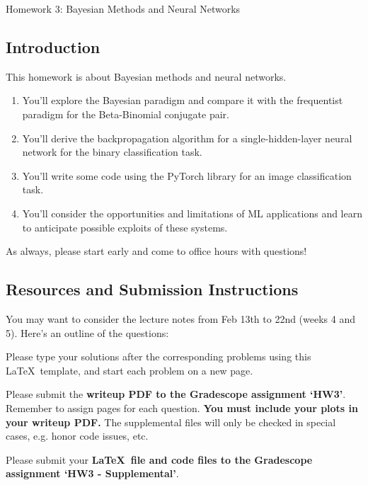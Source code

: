 \documentclass[submit]{harvardml}
\begin{document}
\begin{center}
  {\Large Homework 3: Bayesian Methods and Neural Networks}\\
\end{center}

\subsection*{Introduction}

This homework is about Bayesian methods and neural networks.

\begin{enumerate}
  \item You'll explore the Bayesian paradigm and compare it with the frequentist paradigm for the Beta-Binomial conjugate pair.
  \item You'll derive the backpropagation algorithm for a single-hidden-layer neural network for the binary classification task.
  \item You'll write some code using the PyTorch library for an image classification task.
  \item You'll consider the opportunities and limitations of ML applications and learn to anticipate possible exploits of these systems.
\end{enumerate}

As always, please start early and come to office hours with questions!

\subsection*{Resources and Submission Instructions}
You may want to consider the lecture notes from Feb 13th to 22nd (weeks 4 and 5). Here's an outline of the questions:

Please type your solutions after the corresponding problems using this
\LaTeX\ template, and start each problem on a new page.

Please submit the \textbf{writeup PDF to the Gradescope assignment `HW3'}. Remember to assign pages for each question.  \textbf{You must include your plots in your writeup PDF. } The supplemental files will only be checked in special cases, e.g. honor code issues, etc.

Please submit your \textbf{\LaTeX\ file and code files to the Gradescope assignment `HW3 - Supplemental'}. \\


\newpage

\end{document}
